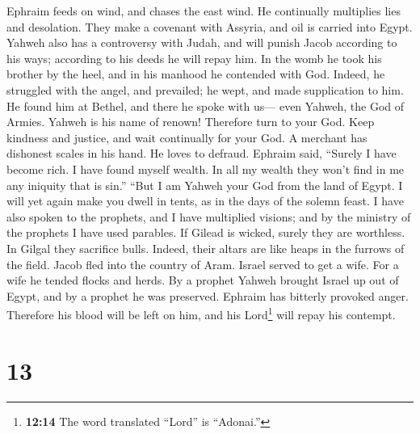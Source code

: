  Ephraim feeds on wind, and chases the east wind. He
continually multiplies lies and desolation. They make a covenant with
Assyria, and oil is carried into Egypt.  Yahweh also has a
controversy with Judah, and will punish Jacob according to his ways;
according to his deeds he will repay him.  In the womb he
took his brother by the heel, and in his manhood he contended with God.
 Indeed, he struggled with the angel, and prevailed; he
wept, and made supplication to him. He found him at Bethel, and there he
spoke with us---  even Yahweh, the God of Armies. Yahweh
is his name of renown!  Therefore turn to your God. Keep
kindness and justice, and wait continually for your God. 
A merchant has dishonest scales in his hand. He loves to defraud.
 Ephraim said, ``Surely I have become rich. I have found
myself wealth. In all my wealth they won't find in me any iniquity that
is sin.''  ``But I am Yahweh your God from the land of
Egypt. I will yet again make you dwell in tents, as in the days of the
solemn feast.  I have also spoken to the prophets, and I
have multiplied visions; and by the ministry of the prophets I have used
parables.  If Gilead is wicked, surely they are
worthless. In Gilgal they sacrifice bulls. Indeed, their altars are like
heaps in the furrows of the field.  Jacob fled into the
country of Aram. Israel served to get a wife. For a wife he tended
flocks and herds.  By a prophet Yahweh brought Israel up
out of Egypt, and by a prophet he was preserved.  Ephraim
has bitterly provoked anger. Therefore his blood will be left on him,
and his Lord\footnote{\textbf{12:14} The word translated ``Lord'' is
  ``Adonai.''} will repay his contempt.

\hypertarget{section-7}{%
\section{13}\label{section-7}}

